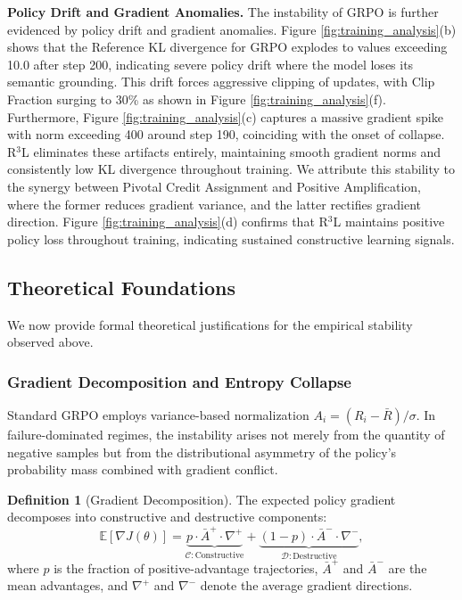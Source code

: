\documentclass[11pt]{article}
\theoremstyle{definition}
\newtheorem{definition}[theorem]{Definition}
\theoremstyle{remark}
\begin{document}
\textbf{Policy Drift and Gradient Anomalies.} The instability of GRPO is further evidenced by policy drift and gradient anomalies. Figure \ref{fig:training_analysis}(b) shows that the Reference KL divergence for GRPO explodes to values exceeding 10.0 after step 200, indicating severe policy drift where the model loses its semantic grounding. This drift forces aggressive clipping of updates, with Clip Fraction surging to 30\% as shown in Figure \ref{fig:training_analysis}(f). Furthermore, Figure \ref{fig:training_analysis}(c) captures a massive gradient spike with norm exceeding 400 around step 190, coinciding with the onset of collapse. R$^3$L eliminates these artifacts entirely, maintaining smooth gradient norms and consistently low KL divergence throughout training. We attribute this stability to the synergy between Pivotal Credit Assignment and Positive Amplification, where the former reduces gradient variance, and the latter rectifies gradient direction. Figure \ref{fig:training_analysis}(d) confirms that R$^3$L maintains positive policy loss throughout training, indicating sustained constructive learning signals.

\subsection{Theoretical Foundations}
\label{sec:theory}
We now provide formal theoretical justifications for the empirical stability observed above.

\subsubsection{Gradient Decomposition and Entropy Collapse}
\label{sec:entropy_collapse}
Standard GRPO employs variance-based normalization $A_i = (R_i - \bar{R})/\sigma$. In failure-dominated regimes, the instability arises not merely from the quantity of negative samples but from the distributional asymmetry of the policy's probability mass combined with gradient conflict.

\begin{definition}[Gradient Decomposition]
The expected policy gradient decomposes into constructive and destructive components:
\begin{equation}
\mathbb{E}[\nabla J(\theta)] = \underbrace{p \cdot \bar{A}^+ \cdot \nabla^+}_{\mathcal{C}: \text{Constructive}} + \underbrace{(1-p) \cdot \bar{A}^- \cdot \nabla^-}_{\mathcal{D}: \text{Destructive}} ,
\end{equation}
where $p$ is the fraction of positive-advantage trajectories, $\bar{A}^+$ and $\bar{A}^-$ are the mean advantages, and $\nabla^+$ and $\nabla^-$ denote the average gradient directions.
\end{definition}
\end{document}
